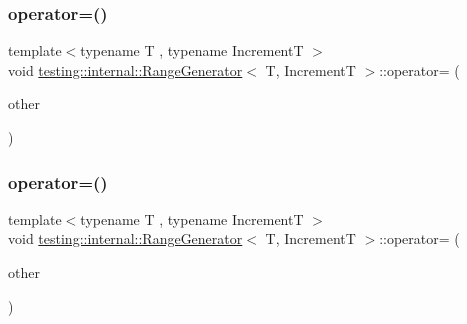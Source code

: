 \mbox{\label{classtesting_1_1internal_1_1_range_generator_a00ef0f268e44d48d129a52bf0f9f9539}} 
\subsubsection{\texorpdfstring{operator=()}{operator=()}\hspace{0.1cm}{\footnotesize\ttfamily [2/3]}}
{\footnotesize\ttfamily template$<$typename T , typename IncrementT $>$ \\
void \mbox{\hyperlink{classtesting_1_1internal_1_1_range_generator}{testing\+::internal\+::\+Range\+Generator}}$<$ T, IncrementT $>$\+::operator= (\begin{DoxyParamCaption}\item[{const \mbox{\hyperlink{classtesting_1_1internal_1_1_range_generator}{Range\+Generator}}$<$ T, IncrementT $>$ \&}]{other }\end{DoxyParamCaption})\hspace{0.3cm}{\ttfamily [private]}}

\mbox{\label{classtesting_1_1internal_1_1_range_generator_a00ef0f268e44d48d129a52bf0f9f9539}} 
\subsubsection{\texorpdfstring{operator=()}{operator=()}\hspace{0.1cm}{\footnotesize\ttfamily [3/3]}}
{\footnotesize\ttfamily template$<$typename T , typename IncrementT $>$ \\
void \mbox{\hyperlink{classtesting_1_1internal_1_1_range_generator}{testing\+::internal\+::\+Range\+Generator}}$<$ T, IncrementT $>$\+::operator= (\begin{DoxyParamCaption}\item[{const \mbox{\hyperlink{classtesting_1_1internal_1_1_range_generator}{Range\+Generator}}$<$ T, IncrementT $>$ \&}]{other }\end{DoxyParamCaption})\hspace{0.3cm}{\ttfamily [private]}}



